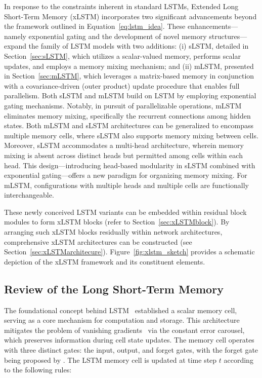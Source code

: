 In response to the constraints inherent in standard LSTMs, Extended Long Short-Term Memory (xLSTM) incorporates two significant advancements beyond the framework outlined in Equation~\eqref{eq:lstm_idea}. These enhancements—namely exponential gating and the development of novel memory structures—expand the family of LSTM models with two additions: (i) sLSTM, detailed in Section~\ref{sec:sLSTM}, which utilizes a scalar-valued memory, performs scalar updates, and employs a memory mixing mechanism; and (ii) mLSTM, presented in Section~\ref{sec:mLSTM}, which leverages a matrix-based memory in conjunction with a covariance-driven (outer product) update procedure that enables full parallelism. Both sLSTM and mLSTM build on LSTM by employing exponential gating mechanisms. Notably, in pursuit of parallelizable operations, mLSTM eliminates memory mixing, specifically the recurrent connections among hidden states. Both mLSTM and sLSTM architectures can be generalized to encompass multiple memory cells, where sLSTM also supports memory mixing between cells. Moreover, sLSTM accommodates a multi-head architecture, wherein memory mixing is absent across distinct heads but permitted among cells within each head. This design—introducing head-based modularity in sLSTM combined with exponential gating—offers a new paradigm for organizing memory mixing. For mLSTM, configurations with multiple heads and multiple cells are functionally interchangeable.

These newly conceived LSTM variants can be embedded within residual block modules to form xLSTM blocks (refer to Section~\ref{sec:xLSTMblock}). By arranging such xLSTM blocks residually within network architectures, comprehensive xLSTM architectures can be constructed (see Section~\ref{sec:xLSTMarchitecure}). Figure~\ref{fig:xlstm_sketch} provides a schematic depiction of the xLSTM framework and its constituent elements.

\subsection{Review of the Long Short-Term Memory}
\label{sec:orgLSTM}

The foundational concept behind LSTM~\citep{Hochreiter:91,Hochreiter:97nips,Hochreiter:97} established a scalar memory cell, serving as a core mechanism for computation and storage. This architecture mitigates the problem of vanishing gradients~\citep{Hochreiter:91,Hochreiter:00book} via the constant error carousel, which preserves information during cell state updates. The memory cell operates with three distinct gates: the input, output, and forget gates, with the forget gate being proposed by \citet{Gers:00}. The LSTM memory cell is updated at time step $t$ according to the following rules:

